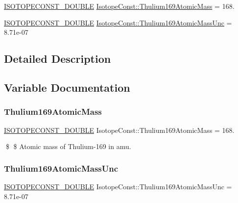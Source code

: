 \begin{DoxyCompactItemize}
\item 
\mbox{\hyperlink{group___isotope_const-_macros_ga8f45a7272ce02c0b4c65c44636ed719a}{I\+S\+O\+T\+O\+P\+E\+C\+O\+N\+S\+T\+\_\+\+D\+O\+U\+B\+LE}} \mbox{\hyperlink{group___isotope_const-_thulium-_tm169_ga6994839b62434dc870838c48eb70d0d1}{Isotope\+Const\+::\+Thulium169\+Atomic\+Mass}} = 168.
\item 
\mbox{\hyperlink{group___isotope_const-_macros_ga8f45a7272ce02c0b4c65c44636ed719a}{I\+S\+O\+T\+O\+P\+E\+C\+O\+N\+S\+T\+\_\+\+D\+O\+U\+B\+LE}} \mbox{\hyperlink{group___isotope_const-_thulium-_tm169_gab2afce199fca9c55f4109f4a972ee9e0}{Isotope\+Const\+::\+Thulium169\+Atomic\+Mass\+Unc}} = 8.\+71e-\/07
\end{DoxyCompactItemize}


\subsection{Detailed Description}


\subsection{Variable Documentation}
\mbox{\label{group___isotope_const-_thulium-_tm169_ga6994839b62434dc870838c48eb70d0d1}} 
\subsubsection{\texorpdfstring{Thulium169\+Atomic\+Mass}{Thulium169AtomicMass}}
{\footnotesize\ttfamily \mbox{\hyperlink{group___isotope_const-_macros_ga8f45a7272ce02c0b4c65c44636ed719a}{I\+S\+O\+T\+O\+P\+E\+C\+O\+N\+S\+T\+\_\+\+D\+O\+U\+B\+LE}} Isotope\+Const\+::\+Thulium169\+Atomic\+Mass = 168.}

\$ \$ Atomic mass of Thulium-\/169 in amu. \mbox{\label{group___isotope_const-_thulium-_tm169_gab2afce199fca9c55f4109f4a972ee9e0}} 
\subsubsection{\texorpdfstring{Thulium169\+Atomic\+Mass\+Unc}{Thulium169AtomicMassUnc}}
{\footnotesize\ttfamily \mbox{\hyperlink{group___isotope_const-_macros_ga8f45a7272ce02c0b4c65c44636ed719a}{I\+S\+O\+T\+O\+P\+E\+C\+O\+N\+S\+T\+\_\+\+D\+O\+U\+B\+LE}} Isotope\+Const\+::\+Thulium169\+Atomic\+Mass\+Unc = 8.\+71e-\/07}


